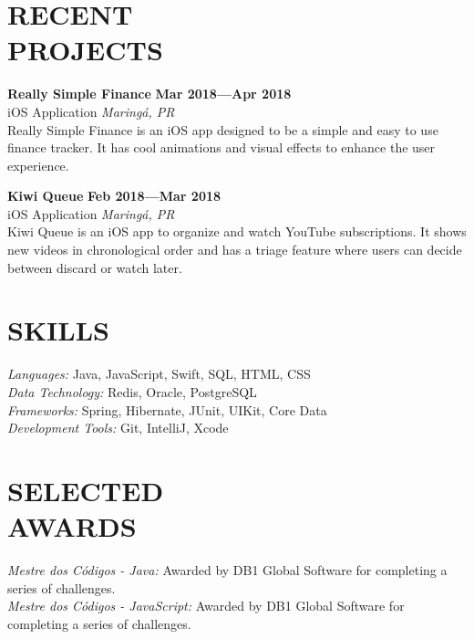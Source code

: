 \documentclass[line,margin]{res}
\begin{document}
\begin{resume}
\section{RECENT \\ PROJECTS}
  {\bf Really Simple Finance} \hfill {\bf Mar 2018---Apr 2018} \\
  iOS Application \hfill {\sl Maring\'a, PR}\\[6pt]
  Really Simple Finance is an iOS app designed to be a simple and easy to use finance tracker.
  It has cool animations and visual effects to enhance the user experience.

  {\bf Kiwi Queue} \hfill {\bf Feb 2018---Mar 2018} \\
  iOS Application \hfill {\sl Maring\'a, PR}\\[6pt]
  Kiwi Queue is an iOS app to organize and watch YouTube subscriptions.
  It shows new videos in chronological order and has a triage feature where users can
  decide between discard or watch later.


\section{SKILLS}
  {\sl Languages:} Java, JavaScript, Swift, SQL, HTML, CSS \\
  {\sl Data Technology:} Redis, Oracle, PostgreSQL \\
  {\sl Frameworks:} Spring, Hibernate, JUnit, UIKit, Core Data \\
  {\sl Development Tools:} Git, IntelliJ, Xcode


\section{SELECTED \\ AWARDS}             
  {\sl Mestre dos C\'odigos - Java:} Awarded by DB1 Global Software for completing a series of challenges.\\
  {\sl Mestre dos C\'odigos - JavaScript:} Awarded by DB1 Global Software for completing a series of challenges.\\
 

\end{resume}
\end{document}
